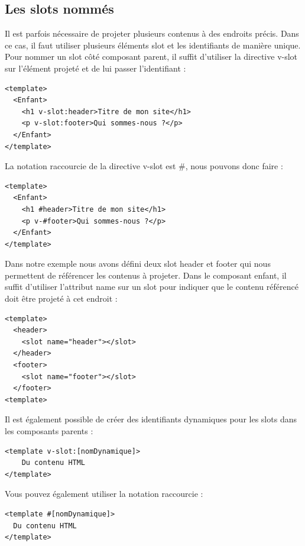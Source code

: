 \documentclass{article}
\begin{document}
\subsection{Les {\color{monOrange}slots} nommés}
Il est parfois nécessaire de projeter plusieurs contenus à des endroits précis. Dans ce cas, il faut utiliser plusieurs éléments {\color{monOrange}slot} et les identifiants de manière unique. Pour nommer un {\color{monOrange}slot} côté composant parent, il suffit d'utiliser la directive {\color{monOrange}v-slot} sur l'élément projeté et de lui passer l'identifiant :
\begin{verbatim}
<template>
  <Enfant>
    <h1 v-slot:header>Titre de mon site</h1>
    <p v-slot:footer>Qui sommes-nous ?</p>
  </Enfant>
</template>
\end{verbatim}
La notation raccourcie de la directive {\color{monOrange}v-slot} est {\color{monOrange}\#}, nous pouvons donc faire :
\begin{verbatim}
<template>
  <Enfant>
    <h1 #header>Titre de mon site</h1>
    <p v-#footer>Qui sommes-nous ?</p>
  </Enfant>
</template>
\end{verbatim}
Dans notre exemple nous avons défini deux {\color{monOrange}slot header} et {\color{monOrange}footer} qui nous permettent de référencer les contenus à projeter. Dans le composant enfant, il suffit d'utiliser l'attribut {\color{monOrange}name} sur un {\color{monOrange}slot} pour indiquer que le contenu référencé doit être projeté à cet endroit :
\begin{verbatim}
<template>
  <header>
    <slot name="header"></slot>
  </header>
  <footer>
    <slot name="footer"></slot>
  </footer>
<template>
\end{verbatim}
Il est également possible de créer des identifiants dynamiques pour les {\color{monOrange}slots} dans les composants parents :
\begin{verbatim}
<template v-slot:[nomDynamique]>
    Du contenu HTML
</template>
\end{verbatim}
Vous pouvez également utiliser la notation raccourcie :
\begin{verbatim}
<template #[nomDynamique]>
  Du contenu HTML
</template>
\end{verbatim}
\end{document}
